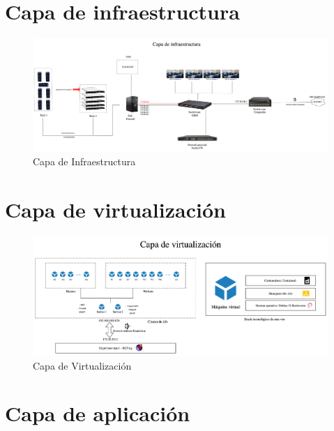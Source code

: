 \section{Capa de infraestructura}

\begin{figure}[H]
    \centering
    \includegraphics[width=\textwidth]{tablas-images/cp6/disenio-N1.png}
    \caption{Capa de Infraestructura}
\end{figure}

\section{Capa de virtualización}

\begin{figure}[H]
    \centering
    \includegraphics[width=\textwidth]{tablas-images/cp6/disenio-N2.png}
    \caption{Capa de Virtualización}
\end{figure}

\section{Capa de aplicación}
